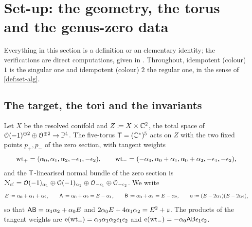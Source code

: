 \section{Set-up: the geometry, the torus and the genus-zero data}
\label{sec:set}

Everything in this section is a definition or an elementary identity; the verifications are direct computations, given in . Throughout, idempotent (colour) $1$ is the singular one and idempotent (colour) $2$ the regular one, in the sense of \cref{def:set-alg}.

\subsection{The target, the tori and the invariants}
\label{sec:set-target}

Let $X$ be the resolved conifold and $Z\coloneqq X\times\mathbb{C}^2$, the total space of $\mathcal{O}(-1)^{\oplus2}\oplus\mathcal{O}^{\oplus2}\to\mathbb{P}^1$. The five-torus $\mathsf{T}=(\mathbb{C}^*)^5$ acts on $Z$ with the two fixed points $p_+,p_-$ of the zero section, with tangent weights
\begin{equation}
\label{eq:set-wts}
\mathrm{wt}_+=(\alpha_0,\alpha_1,\alpha_2,-\epsilon_1,-\epsilon_2),\qquad
\mathrm{wt}_-=(-\alpha_0,\alpha_0+\alpha_1,\alpha_0+\alpha_2,-\epsilon_1,-\epsilon_2) ,
\end{equation}
and the $\mathsf{T}$-linearised normal bundle of the zero section is $\mathcal{N}_{\mathrm{cf}}=\mathcal{O}(-1)_{\alpha_1}\oplus\mathcal{O}(-1)_{\alpha_2}\oplus\mathcal{O}_{-\epsilon_1}\oplus\mathcal{O}_{-\epsilon_2}$. We write
\[
E\coloneqq\alpha_0+\alpha_1+\alpha_2,\qquad \mathsf{A}\coloneqq\alpha_0+\alpha_2=E-\alpha_1,\qquad \mathsf{B}\coloneqq\alpha_0+\alpha_1=E-\alpha_2,\qquad \mathsf{u}\coloneqq(E-2\alpha_1)(E-2\alpha_2),
\]
so that $\mathsf{A}\mathsf{B}=\alpha_1\alpha_2+\alpha_0E$ and $2\alpha_0E+4\alpha_1\alpha_2=E^2+\mathsf{u}$. The products of the tangent weights are $\mathrm{e}(\mathrm{wt}_+)=\alpha_0\alpha_1\alpha_2\epsilon_1\epsilon_2$ and $\mathrm{e}(\mathrm{wt}_-)=-\alpha_0\mathsf{A}\mathsf{B}\epsilon_1\epsilon_2$.


